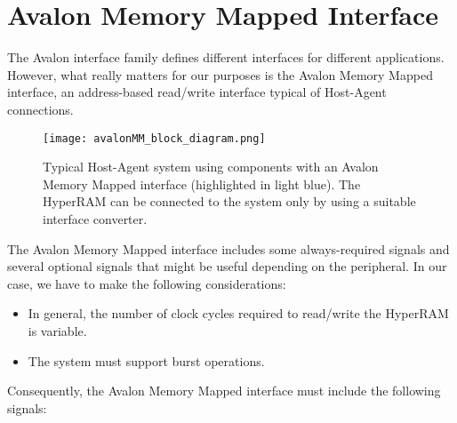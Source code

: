 \documentclass[10pt, english, a4paper, titlepage, oneside]{book}
\begin{document}
\section{Avalon Memory Mapped Interface}
\vspace{2mm}
The Avalon interface family defines different interfaces for different applications. However, what really matters for our purposes is the Avalon Memory Mapped interface, an address-based read/write interface typical of Host-Agent connections.
\vspace{6mm}
\begin{figure}[H]
    \centering
    \captionsetup{width=12cm}
    \texttt{[image: avalonMM\_block\_diagram.png]}
    \vspace{5mm}
    \caption{\centering Typical Host-Agent system using components with an Avalon Memory Mapped interface (highlighted in light blue). The HyperRAM can be connected to the system only by using a suitable interface converter.}
    \label{avalonMM_block_diagram}
\end{figure}
\vspace{4mm}
\noindent The Avalon Memory Mapped interface includes some always-required signals and several optional signals that might be useful depending on the peripheral. In our case, we have to make the following considerations:
\vspace{2mm}
\begin{itemize}
    \item In general, the number of clock cycles required to read/write the HyperRAM is variable.
    \vspace{1mm}
    \item The system must support burst operations.
\end{itemize} 
\vspace{4mm}
Consequently, the Avalon Memory Mapped interface must include the following signals:
\vspace{2mm}
\end{document}
